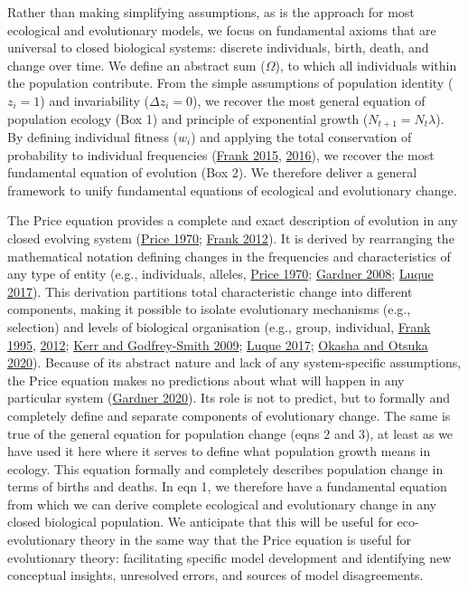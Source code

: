 \documentclass[
]{article}
\begin{document}
Rather than making simplifying assumptions, as is the approach for most
ecological and evolutionary models, we focus on fundamental axioms that
are universal to closed biological systems: discrete individuals, birth,
death, and change over time. We define an abstract sum (\(\Omega\)), to
which all individuals within the population contribute. From the simple
assumptions of population identity (\(z_{i} = 1\)) and invariability
(\(\Delta z_{i} = 0\)), we recover the most general equation of
population ecology (Box 1) and principle of exponential growth
(\(N_{t+1} = N_{t}\lambda\)). By defining individual fitness (\(w_{i}\))
and applying the total conservation of probability to individual
frequencies (\protect\hyperlink{ref-Frank2015}{Frank 2015},
\protect\hyperlink{ref-Frank2016}{2016}), we recover the most
fundamental equation of evolution (Box 2). We therefore deliver a
general framework to unify fundamental equations of ecological and
evolutionary change.

The Price equation provides a complete and exact description of
evolution in any closed evolving system
(\protect\hyperlink{ref-Price1970}{Price 1970};
\protect\hyperlink{ref-Frank2012}{Frank 2012}). It is derived by
rearranging the mathematical notation defining changes in the
frequencies and characteristics of any type of entity (e.g.,
individuals, alleles, \protect\hyperlink{ref-Price1970}{Price 1970};
\protect\hyperlink{ref-Gardner2008}{Gardner 2008};
\protect\hyperlink{ref-Luque2016}{Luque 2017}). This derivation
partitions total characteristic change into different components, making
it possible to isolate evolutionary mechanisms (e.g., selection) and
levels of biological organisation (e.g., group, individual,
\protect\hyperlink{ref-Frank1995}{Frank 1995},
\protect\hyperlink{ref-Frank2012}{2012};
\protect\hyperlink{ref-Kerr2009}{Kerr and Godfrey-Smith 2009};
\protect\hyperlink{ref-Luque2016}{Luque 2017};
\protect\hyperlink{ref-Okasha2020}{Okasha and Otsuka 2020}). Because of
its abstract nature and lack of any system-specific assumptions, the
Price equation makes no predictions about what will happen in any
particular system (\protect\hyperlink{ref-Gardner2020}{Gardner 2020}).
Its role is not to predict, but to formally and completely define and
separate components of evolutionary change. The same is true of the
general equation for population change (eqns 2 and 3), at least as we
have used it here where it serves to define what population growth means
in ecology. This equation formally and completely describes population
change in terms of births and deaths. In eqn 1, we therefore have a
fundamental equation from which we can derive complete ecological and
evolutionary change in any closed biological population. We anticipate
that this will be useful for eco-evolutionary theory in the same way
that the Price equation is useful for evolutionary theory: facilitating
specific model development and identifying new conceptual insights,
unresolved errors, and sources of model disagreements.
\end{document}
